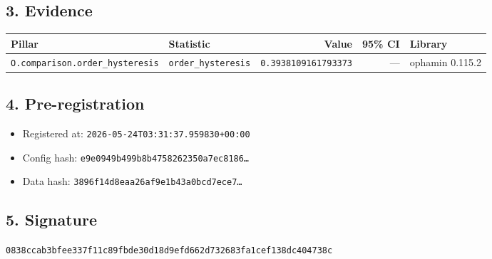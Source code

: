\documentclass{article}
\begin{document}
\subsection*{3. Evidence}
\begin{tabular}{llrrl}\toprule
\textbf{Pillar} & \textbf{Statistic} & \textbf{Value} & \textbf{95\% CI} & \textbf{Library} \\\midrule
\texttt{O.comparison.order\_hysteresis} & \texttt{order\_hysteresis} & \texttt{0.3938109161793373} & --- & ophamin 0.115.2 \\
\bottomrule\end{tabular}
\subsection*{4. Pre-registration}
\begin{itemize}
\item Registered at: \texttt{2026-05-24T03:31:37.959830+00:00}
\item Config hash: \texttt{e9e0949b499b8b4758262350a7ec8186\dots}
\item Data hash: \texttt{3896f14d8eaa26af9e1b43a0bcd7ece7\dots}
\end{itemize}
\subsection*{5. Signature}
\texttt{0838ccab3bfee337f11c89fbde30d18d9efd662d732683fa1cef138dc404738c}\\
\end{document}
